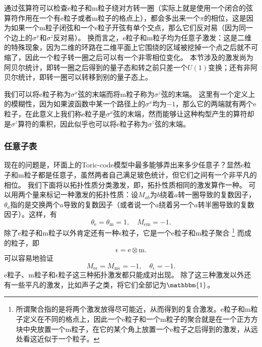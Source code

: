 通过弦算符可以检查e粒子和m粒子绕对方转一圈（实际上就是使用一个闭合的弦算符作用在一个有e粒子或者m粒子的格点上），都会多出来一个$\pi$的相位，这是因为如果一个m粒子闭弦和一个e粒子开弦有单个交点，那么它们反对易（因为同一个边上的${\sigma}^x$和${\sigma}^z$反对易）。
换而言之，e粒子和m粒子均为任意子激发：这是二维的特殊现象，因为二维的环路在二维平面上它围绕的区域被挖掉一个点之后就不可缩了，因此一个粒子转一圈之后可以有一个非零相位变化。
本节涉及的激发尚为阿贝尔统计，即转一圈之后得到的量子态和转之前只差一个$U(1)$变换；还有非阿贝尔统计，即转一圈可以转移到别的量子态上。

我们可以将e粒子称为$\sigma^x$弦的末端而将m粒子称为$\sigma^z$弦的末端。
这里有一个定义上的模糊性，因为如果波函数中某一个路径上的$\sigma^x$均为$-1$，那么它的两端就有两个e粒子，在此意义上我们称e粒子是$\sigma^x$弦的末端，然而能够让这种构型产生的算符却是$\sigma^z$算符的乘积，因此似乎也可以将e粒子称为$\sigma^z$弦的末端。

\subsubsection{任意子表}

现在的问题是，环面上的Toric-code模型中最多能够弄出来多少任意子？显然e粒子和m粒子都是任意子，虽然两者自己满足玻色统计，但它们之间有一个非平凡的相位。
我们下面将以拓扑性质分类激发，即，拓扑性质相同的激发算作一种。
可以用两个量来标记一种激发的拓扑性质：设$M_{ab}$为$b$绕着$a$转一圈导致的复数因子，$\theta_a$指的是交换两个$a$导致的复数因子（或者说一个$a$绕着另一个$a$转半圈导致的复数因子）。这样，有
\begin{equation}
    \theta_\mathrm{e} = \theta_\mathrm{m} = 1, \quad M_\mathrm{em} = - 1.
\end{equation}
除了e粒子和m粒子以外肯定还有一种$\mathrm{\epsilon}$粒子，它是一个e粒子和m粒子聚合%
\footnote{所谓聚合指的是将两个激发放得尽可能近，从而得到的复合激发。e粒子和m粒子定义在不同的格点上，因此一个e粒子和一个m粒子的聚合就是在一个正方方块中央放置一个m粒子，在它的某个角上放置一个e粒子之后得到的激发，从远处看这近似于一个粒子。}%
而成的粒子，即
\begin{equation}
    \mathrm{\epsilon} = \mathrm{e} \otimes \mathrm{m}.
\end{equation}
可以容易地验证
\begin{equation}
    M_\mathrm{e\epsilon} = M_\mathrm{m\epsilon} = -1, \quad \theta_\mathrm{\epsilon} = -1.
\end{equation}
e粒子、m粒子和$\mathrm{\epsilon}$粒子这三种拓扑激发都只能成对出现。
除了这三种激发以外还有一些平凡的激发，比如声子之类，将它们全部记为$\mathbbm{1}$。

